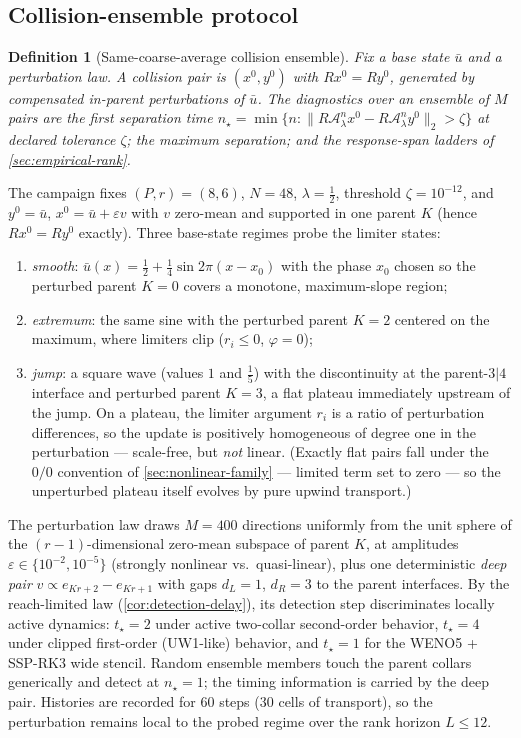 \documentclass[pdflatex,sn-mathphys-num]{sn-jnl}%
\theoremstyle{thmstyleone}%
\theoremstyle{thmstyletwo}%
\theoremstyle{thmstylethree}%
\newtheorem{definition}{Definition}%
\begin{document}
\subsection{Collision-ensemble protocol}\label{sec:collision-protocol}

\begin{definition}[Same-coarse-average collision ensemble]\label{def:collision-ensemble}
Fix a base state $\bar u$ and a perturbation law.
A collision pair is $(x^0,y^0)$ with $Rx^0=Ry^0$, generated by compensated in-parent perturbations of $\bar u$.
The diagnostics over an ensemble of $M$ pairs are the first separation time $n_\star=\min\{n: \|R\mathcal A_\lambda^n x^0 - R\mathcal A_\lambda^n y^0\|_2>\zeta\}$ at declared tolerance $\zeta$; the maximum separation; and the response-span ladders of \cref{sec:empirical-rank}.
\end{definition}

The campaign fixes $(P,r)=(8,6)$, $N=48$, $\lambda=\tfrac12$, threshold $\zeta=10^{-12}$, and $y^0=\bar u$, $x^0=\bar u+\varepsilon v$ with $v$ zero-mean and supported in one parent $K$ (hence $Rx^0=Ry^0$ exactly).
Three base-state regimes probe the limiter states:
\begin{enumerate}
\item[(a)] \emph{smooth}: $\bar u(x)=\tfrac12+\tfrac14\sin 2\pi(x-x_0)$ with the phase $x_0$ chosen so the perturbed parent $K=0$ covers a monotone, maximum-slope region;
\item[(b)] \emph{extremum}: the same sine with the perturbed parent $K=2$ centered on the maximum, where limiters clip ($r_i\le0$, $\varphi=0$);
\item[(c)] \emph{jump}: a square wave (values $1$ and $\tfrac15$) with the discontinuity at the parent-$3|4$ interface and perturbed parent $K=3$, a flat plateau immediately upstream of the jump.
      On a plateau, the limiter argument $r_i$ is a ratio of perturbation differences, so the update is positively homogeneous of degree one in the perturbation --- scale-free, but \emph{not} linear.
      (Exactly flat pairs fall under the $0/0$ convention of \cref{sec:nonlinear-family} --- limited term set to zero --- so the unperturbed plateau itself evolves by pure upwind transport.)
\end{enumerate}
The perturbation law draws $M=400$ directions uniformly from the unit sphere of the $(r-1)$-dimensional zero-mean subspace of parent $K$, at amplitudes $\varepsilon\in\{10^{-2},10^{-5}\}$ (strongly nonlinear vs.\ quasi-linear), plus one deterministic \emph{deep pair} $v\propto e_{Kr+2}-e_{Kr+1}$ with gaps $d_L=1$, $d_R=3$ to the parent interfaces.
By the reach-limited law (\cref{cor:detection-delay}), its detection step discriminates locally active dynamics: $t_\star=2$ under active two-collar second-order behavior, $t_\star=4$ under clipped first-order (UW1-like) behavior, and $t_\star=1$ for the WENO5 + SSP-RK3 wide stencil.
Random ensemble members touch the parent collars generically and detect at $n_\star=1$; the timing information is carried by the deep pair.
Histories are recorded for $60$ steps ($30$ cells of transport), so the perturbation remains local to the probed regime over the rank horizon $L\le12$.
\end{document}
